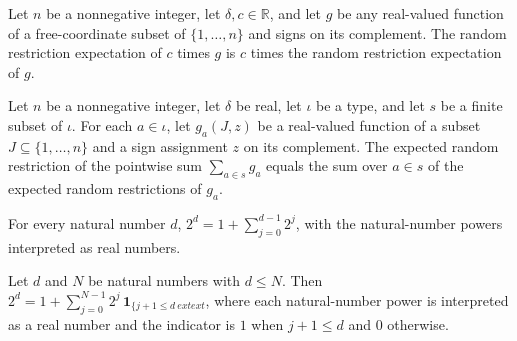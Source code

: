 \begin{theorem}
\label{FABL.expectRandomRestriction_const_mul}
\leanok
{}
Let $n$ be a nonnegative integer, let $\delta,c\in\mathbb R$, and let $g$ be any
real-valued function of a free-coordinate subset of $\{1,\ldots,n\}$ and signs on its
complement. The random restriction expectation of $c$ times $g$ is $c$ times the random
restriction expectation of $g$.
\end{theorem}

\begin{theorem}
\label{FABL.expectRandomRestriction_sum}
\leanok
{}
Let $n$ be a nonnegative integer, let $\delta$ be real, let $\iota$ be a type, and let
$s$ be a finite subset of $\iota$. For each $a\in\iota$, let $g_a(J,z)$ be a real-valued
function of a subset $J\subseteq\{1,\ldots,n\}$ and a sign assignment $z$ on its
complement. The expected random restriction of the pointwise sum $\sum_{a\in s}g_a$
equals the sum over $a\in s$ of the expected random restrictions of $g_a$.
\end{theorem}

\begin{theorem}
\label{FABL.two_pow_eq_one_add_sum_range}
\leanok
{}
For every natural number $d$, $2^d=1+\sum_{j=0}^{d-1}2^j$, with the natural-number
powers interpreted as real numbers.
\end{theorem}

\begin{theorem}
\label{FABL.two_pow_eq_one_add_sum_tailIndicators}
\leanok
{}
Let $d$ and $N$ be natural numbers with $d\le N$. Then
$2^d=1+\sum_{j=0}^{N-1}2^j\,\boldsymbol{1}_{\{j+1\le d\	ext	ext{}}$, where each
natural-number power is interpreted as a real number and the indicator is $1$ when
$j+1\le d$ and $0$ otherwise.
\end{theorem}

